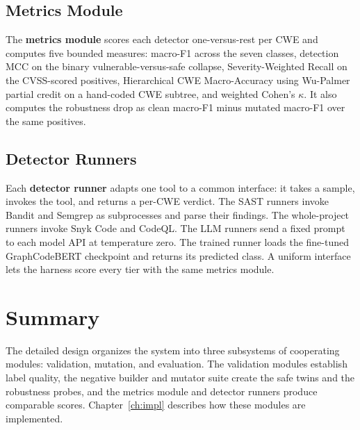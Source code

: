 \subsection{Metrics Module}

The \textbf{metrics module} scores each detector one-versus-rest per CWE and
computes five bounded measures: macro-F1 across the seven classes, detection MCC
on the binary vulnerable-versus-safe collapse, Severity-Weighted Recall on the
CVSS-scored positives, Hierarchical CWE Macro-Accuracy using Wu-Palmer partial
credit on a hand-coded CWE subtree, and weighted Cohen's $\kappa$. It also
computes the robustness drop as clean macro-F1 minus mutated macro-F1 over the
same positives.

\subsection{Detector Runners}

Each \textbf{detector runner} adapts one tool to a common interface: it takes a
sample, invokes the tool, and returns a per-CWE verdict. The SAST runners invoke
Bandit and Semgrep as subprocesses and parse their findings. The whole-project
runners invoke Snyk Code and CodeQL. The LLM runners send a fixed prompt to each
model API at temperature zero. The trained runner loads the fine-tuned
GraphCodeBERT checkpoint and returns its predicted class. A uniform interface
lets the harness score every tier with the same metrics module.

\section{Summary}

The detailed design organizes the system into three subsystems of cooperating
modules: validation, mutation, and evaluation. The validation modules establish
label quality, the negative builder and mutator suite create the safe twins and
the robustness probes, and the metrics module and detector runners produce
comparable scores. Chapter~\ref{ch:impl} describes how these modules are
implemented.
